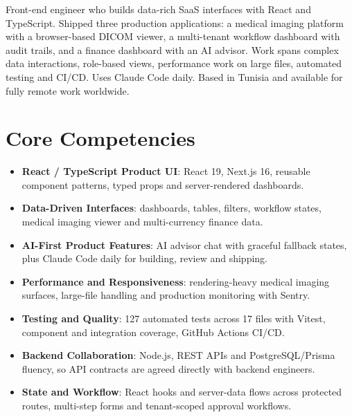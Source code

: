 \documentclass[11pt,a4paper,sans]{moderncv}
\begin{document}
\makecvtitle

\vspace{6pt}
\small{Front-end engineer who builds data-rich SaaS interfaces with React and TypeScript. Shipped three production applications: a medical imaging platform with a browser-based DICOM viewer, a multi-tenant workflow dashboard with audit trails, and a finance dashboard with an AI advisor. Work spans complex data interactions, role-based views, performance work on large files, automated testing and CI/CD. Uses Claude Code daily. Based in Tunisia and available for fully remote work worldwide.}

\section{Core Competencies}
\vspace{1pt}
\begin{itemize}
\item \textbf{React / TypeScript Product UI}: React 19, Next.js 16, reusable component patterns, typed props and server-rendered dashboards.
\item \textbf{Data-Driven Interfaces}: dashboards, tables, filters, workflow states, medical imaging viewer and multi-currency finance data.
\item \textbf{AI-First Product Features}: AI advisor chat with graceful fallback states, plus Claude Code daily for building, review and shipping.
\item \textbf{Performance and Responsiveness}: rendering-heavy medical imaging surfaces, large-file handling and production monitoring with Sentry.
\item \textbf{Testing and Quality}: 127 automated tests across 17 files with Vitest, component and integration coverage, GitHub Actions CI/CD.
\item \textbf{Backend Collaboration}: Node.js, REST APIs and PostgreSQL/Prisma fluency, so API contracts are agreed directly with backend engineers.
\item \textbf{State and Workflow}: React hooks and server-data flows across protected routes, multi-step forms and tenant-scoped approval workflows.
\end{itemize}
\end{document}
